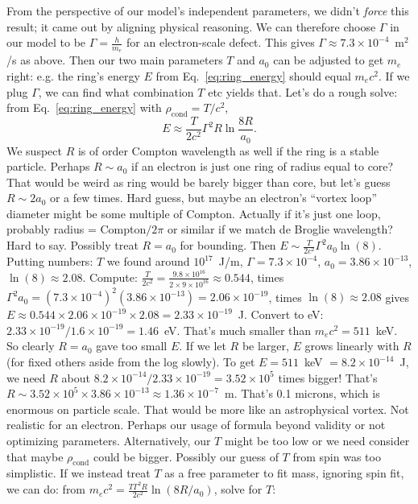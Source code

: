 \documentclass[12pt]{article}
\begin{document}
From the perspective of our model’s independent parameters, we didn’t \textit{force} this result; it came out by aligning physical reasoning. We can therefore choose $\Gamma$ in our model to be $\Gamma = \frac{h}{m_e}$ for an electron-scale defect. This gives $\Gamma \approx 7.3\times10^{-4}$~m$^2$/s as above. Then our two main parameters $T$ and $a_0$ can be adjusted to get $m_e$ right: e.g. the ring’s energy $E$ from Eq.~\eqref{eq:ring_energy} should equal $m_e c^2$. If we plug $\Gamma$, we can find what combination $T$ etc yields that. Let’s do a rough solve: from Eq.~\eqref{eq:ring_energy} with $\rho_{\text{cond}} = T/c^2$,
\begin{equation}
    E \approx \frac{T}{2c^2} \Gamma^2 R \ln\frac{8R}{a_0}.
\end{equation}
We suspect $R$ is of order Compton wavelength as well if the ring is a stable particle. Perhaps $R \sim a_0$ if an electron is just one ring of radius equal to core? That would be weird as ring would be barely bigger than core, but let's guess $R \sim 2a_0$ or a few times. Hard guess, but maybe an electron's ``vortex loop'' diameter might be some multiple of Compton. Actually if it’s just one loop, probably radius = Compton$/2\pi$ or similar if we match de Broglie wavelength? Hard to say. Possibly treat $R = a_0$ for bounding. Then $E \sim \frac{T}{2c^2} \Gamma^2 a_0 \ln(8)$. Putting numbers: $T$ we found around $10^{17}$~J/m, $\Gamma = 7.3\times10^{-4}$, $a_0=3.86\times10^{-13}$, $\ln(8)\approx2.08$. Compute: $\frac{T}{2c^2} = \frac{9.8\times10^{16}}{2\times9\times10^{16}} \approx 0.544$, times $\Gamma^2 a_0 = (7.3\times10^{-4})^2 (3.86\times10^{-13}) = 2.06\times10^{-19}$, times $\ln(8)\approx 2.08$ gives $E\approx 0.544\times 2.06\times10^{-19} \times2.08 = 2.33\times10^{-19}$~J. Convert to eV: $2.33\times10^{-19}/1.6\times10^{-19} = 1.46$~eV. That’s much smaller than $m_e c^2 = 511$~keV. So clearly $R=a_0$ gave too small $E$. If we let $R$ be larger, $E$ grows linearly with $R$ (for fixed others aside from the log slowly). To get $E=511$~keV $= 8.2\times10^{-14}$~J, we need $R$ about $8.2\times10^{-14} / 2.33\times10^{-19} = 3.52\times10^5$ times bigger! That’s $R \sim 3.52\times10^5 \times 3.86\times10^{-13} \approx 1.36\times10^{-7}$~m. That’s 0.1 microns, which is enormous on particle scale. That would be more like an astrophysical vortex. Not realistic for an electron. Perhaps our usage of formula beyond validity or not optimizing parameters. Alternatively, our $T$ might be too low or we need consider that maybe $\rho_{\text{cond}}$ could be bigger. Possibly our guess of $T$ from spin was too simplistic. If we instead treat $T$ as a free parameter to fit mass, ignoring spin fit, we can do: from $m_e c^2 = \frac{T \Gamma^2 R}{2c^2} \ln(8R/a_0)$, solve for $T$:
\end{document}
